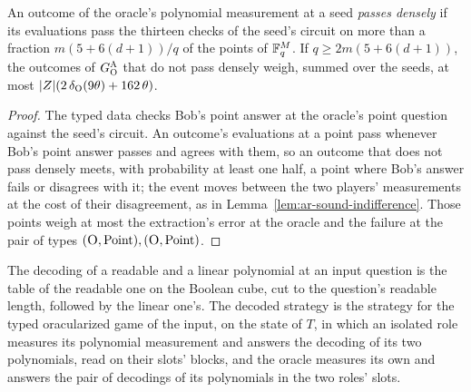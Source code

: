 \begin{lemma}
\label{lem:ar-sound-check}
\leanok
An outcome of the oracle's polynomial measurement at a seed \emph{passes densely} if its
evaluations pass the thirteen checks of the seed's circuit on more than a fraction
$m (5 + 6 (d + 1)) / q$ of the points of $\mathbb{F}_q^M$. If $q \geq 2 m (5 + 6 (d + 1))$, the outcomes of
$G^{\textsc{A}}_{\textsc{O}}$ that do not pass densely weigh, summed over the seeds, at most
$|Z| (2\, \delta_{\textsc{O}}(9\theta) + 162\, \theta)$.
\end{lemma}

\begin{proof}
\leanok
The typed data checks Bob's point answer at the oracle's point question against the seed's
circuit. An outcome's evaluations at a point pass whenever Bob's point answer passes and agrees
with them, so an outcome that does not pass densely meets, with probability at least one half, a
point where Bob's answer fails or disagrees with it; the event moves between the two players'
measurements at the cost of their disagreement, as in Lemma~\ref{lem:ar-sound-indifference}.
Those points weigh at most the extraction's error at the oracle and the failure at the pair of
types $(\textsc{O}, \mathrm{Point}), (\textsc{O}, \mathrm{Point})$.
\end{proof}

\begin{definition}
\label{def:ar-decoded-strategy}
\leanok
The decoding of a readable and a linear polynomial at an input question is the table of the
readable one on the Boolean cube, cut to the question's readable length, followed by the linear
one's. The decoded strategy is the strategy for the typed oracularized game of the input, on the
state of $T$, in which an isolated role measures its polynomial measurement and answers the
decoding of its two polynomials, read on their slots' blocks, and the oracle measures its own and
answers the pair of decodings of its polynomials in the two roles' slots.
\end{definition}

